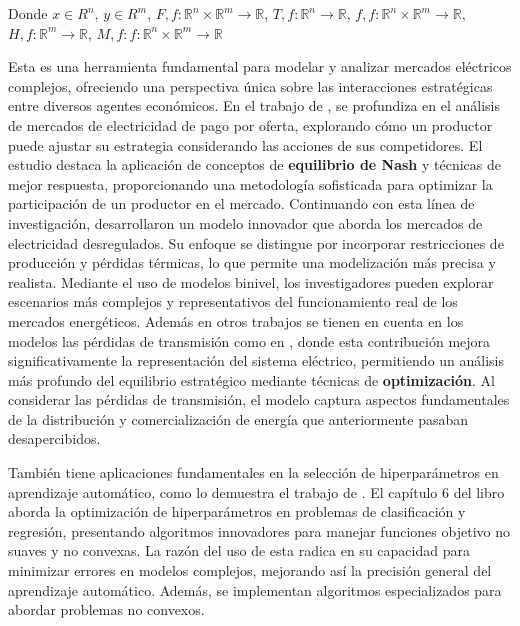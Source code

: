 Donde $x \in R^{n}$, $y \in R^{m}$, $F, f : \mathbb{R}^{n} \times \mathbb{R}^{m} \to \mathbb{R}$,  $T , f :\mathbb{R}^{n} \to \mathbb{R}$, 
$f, f : \mathbb{R}^{n} \times \mathbb{R}^{m} \to \mathbb{R} $, $H , f: \mathbb{R}^{m} \to \mathbb{R}$, $M , f : f : \mathbb{R}^{n} \times \mathbb{R}^{m} \to \mathbb{R}$


Esta es una herramienta fundamental para modelar y analizar mercados eléctricos complejos, ofreciendo una perspectiva única sobre las interacciones estratégicas entre diversos agentes económicos.
En el trabajo de \cite{Aussel2017NashEI}, se profundiza en el análisis de mercados de electricidad de pago por oferta, explorando cómo un productor puede ajustar su estrategia considerando las acciones de sus competidores. El estudio destaca la aplicación de conceptos de \textbf{equilibrio de Nash} y técnicas de mejor respuesta, proporcionando una metodología sofisticada para optimizar la participación de un productor en el mercado.
Continuando con esta línea de investigación, \cite{Aussel2016DeregulatedEM} desarrollaron un modelo innovador que aborda los mercados de electricidad desregulados. Su enfoque se distingue por incorporar restricciones de producción y pérdidas térmicas, lo que permite una modelización más precisa y realista. Mediante el uso de modelos binivel, los investigadores pueden explorar escenarios más complejos y representativos del funcionamiento real de los mercados energéticos.
Además en otros trabajos se tienen en cuenta en los modelos las pérdidas de transmisión como en  \cite{Aussel2013ElectricitySM}, donde esta contribución mejora significativamente la representación del sistema eléctrico, permitiendo un análisis más profundo del equilibrio estratégico mediante técnicas de \textbf{optimización}. Al considerar las pérdidas de transmisión, el modelo captura aspectos fundamentales de la distribución y comercialización de energía que anteriormente pasaban desapercibidos.

También tiene aplicaciones fundamentales en la selección de hiperparámetros en aprendizaje automático, como lo demuestra el trabajo de \cite{DempeyZemkoho2020ML}. El capítulo 6 del libro aborda la optimización de hiperparámetros en problemas de clasificación y regresión, presentando algoritmos innovadores para manejar funciones objetivo no suaves y no convexas. La razón del uso de esta radica en su capacidad para minimizar errores en modelos complejos, mejorando así la precisión general del aprendizaje automático. Además, se implementan algoritmos especializados para abordar problemas no convexos.

